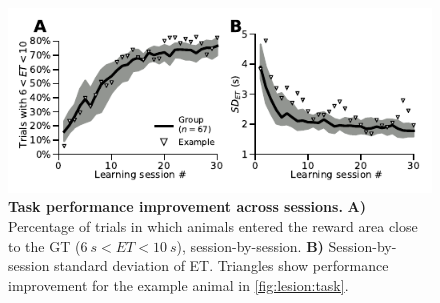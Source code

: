 \begin{figure}[h!]
	\begin{center}
		\includegraphics[scale=1]{ch-appendicies/figures/CorrectTrialCurve.pdf}
		\caption[Task Performance Improvement]
		{\textbf{Task performance improvement across sessions.}
		\textbf{A)}
		Percentage of trials in which animals entered the reward area close to the GT ($6~s<ET<10~s$), session-by-session.
		\textbf{B)}
		Session-by-session standard deviation of ET.
		Triangles show performance improvement for the example animal in \autoref{fig:lesion:task}.
		}
		\label{fig:appendix:CorrectTrialCurve}
	\end{center}
\end{figure}